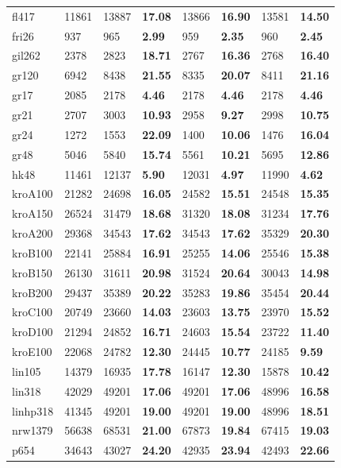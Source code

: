 \begin{figure}[ht]
\begin{minipage}{\linewidth}
\begin{tabular}{*{3}{L{1.6cm}} >{\bfseries}L{1.6cm} L{1.6cm} >{\bfseries}L{1.6cm} L{1.6cm} >{\bfseries}L{1.6cm}}
			fl417     & 11861  & 13887  & 17.08  & 13866  & 16.90 & 13581  & 14.50  \\
			fri26     & 937    & 965    & 2.99   & 959    & 2.35  & 960    & 2.45   \\
			gil262    & 2378   & 2823   & 18.71  & 2767   & 16.36 & 2768   & 16.40  \\
			gr120     & 6942   & 8438   & 21.55  & 8335   & 20.07 & 8411   & 21.16  \\
			gr17      & 2085   & 2178   & 4.46   & 2178   & 4.46  & 2178   & 4.46   \\
			gr21      & 2707   & 3003   & 10.93  & 2958   & 9.27  & 2998   & 10.75  \\
			gr24      & 1272   & 1553   & 22.09  & 1400   & 10.06 & 1476   & 16.04  \\
			gr48      & 5046   & 5840   & 15.74  & 5561   & 10.21 & 5695   & 12.86  \\
			hk48      & 11461  & 12137  & 5.90   & 12031  & 4.97  & 11990  & 4.62   \\
			kroA100   & 21282  & 24698  & 16.05  & 24582  & 15.51 & 24548  & 15.35  \\
			kroA150   & 26524  & 31479  & 18.68  & 31320  & 18.08 & 31234  & 17.76  \\
			kroA200   & 29368  & 34543  & 17.62  & 34543  & 17.62 & 35329  & 20.30  \\
			kroB100   & 22141  & 25884  & 16.91  & 25255  & 14.06 & 25546  & 15.38  \\
			kroB150   & 26130  & 31611  & 20.98  & 31524  & 20.64 & 30043  & 14.98  \\
			kroB200   & 29437  & 35389  & 20.22  & 35283  & 19.86 & 35454  & 20.44  \\
			kroC100   & 20749  & 23660  & 14.03  & 23603  & 13.75 & 23970  & 15.52  \\
			kroD100   & 21294  & 24852  & 16.71  & 24603  & 15.54 & 23722  & 11.40  \\
			kroE100   & 22068  & 24782  & 12.30  & 24445  & 10.77 & 24185  & 9.59   \\
			lin105    & 14379  & 16935  & 17.78  & 16147  & 12.30 & 15878  & 10.42  \\
			lin318    & 42029  & 49201  & 17.06  & 49201  & 17.06 & 48996  & 16.58  \\
			linhp318  & 41345  & 49201  & 19.00  & 49201  & 19.00 & 48996  & 18.51  \\
			nrw1379   & 56638  & 68531  & 21.00  & 67873  & 19.84 & 67415  & 19.03  \\
			p654      & 34643  & 43027  & 24.20  & 42935  & 23.94 & 42493  & 22.66  \\

\end{tabular}
\end{minipage}
\end{figure}
